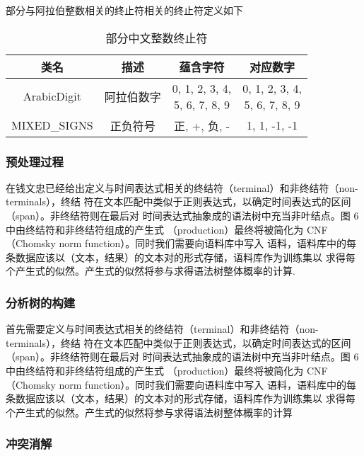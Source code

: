 部分与阿拉伯整数相关的终止符相关的终止符定义如下

\begin{table}[h]
    \centering
    \caption{部分中文整数终止符}
    \begin{tabular}{*{4}{c}}
        \toprule
        类名         & 描述       & 蕴含字符                     & 对应数字     \\
        \midrule
        ArabicDigit  & 阿拉伯数字 & \makecell*[c]{0, 1, 2, 3, 4,                \\ 5, 6, 7, 8, 9} & \makecell*[c]{0, 1, 2, 3, 4, \\ 5, 6, 7, 8, 9}         \\
        MIXED\_SIGNS & 正负符号   & 正, +, 负, -                 & 1, 1, -1, -1 \\
        \bottomrule
    \end{tabular}
\end{table}

\subsubsection{预处理过程}

在钱文忠已经给出定义与时间表达式相关的终结符（terminal）和非终结符（non-terminals），终结
符在文本匹配中类似于正则表达式，以确定时间表达式的区间（span）。非终结符则在最后对
时间表达式抽象成的语法树中充当非叶结点。图 6 中由终结符和非终结符组成的产生式
（production）最终将被简化为 CNF（Chomsky norm function）。同时我们需要向语料库中写入
语料，语料库中的每条数据应该以（文本，结果）的文本对的形式存储，语料库作为训练集以
求得每个产生式的似然。产生式的似然将参与求得语法树整体概率的计算.

\subsubsection{分析树的构建}

首先需要定义与时间表达式相关的终结符（terminal）和非终结符（non-terminals），终结
符在文本匹配中类似于正则表达式，以确定时间表达式的区间（span）。非终结符则在最后对
时间表达式抽象成的语法树中充当非叶结点。图 6 中由终结符和非终结符组成的产生式
（production）最终将被简化为 CNF（Chomsky norm function）。同时我们需要向语料库中写入
语料，语料库中的每条数据应该以（文本，结果）的文本对的形式存储，语料库作为训练集以
求得每个产生式的似然。产生式的似然将参与求得语法树整体概率的计算

\subsubsection{冲突消解}

